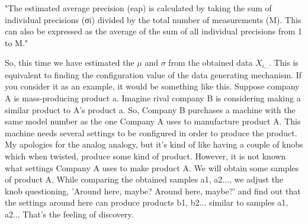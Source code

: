 \documentclass{ltjsbook}
\begin{document}
"The estimated average precision (eap) is calculated by taking the sum of individual precisions (σi) divided by the total number of measurements (M). This can also be expressed as the average of the sum of all individual precisions from 1 to M."

So, this time we have estimated the $\mu$ and $\sigma$ from the obtained data $X_{i,.}$. This is equivalent to finding the configuration value of the data generating mechanism.
If you consider it as an example, it would be something like this.
Suppose company A is mass-producing product a. Imagine rival company B is considering making a similar product to A's product a.
So, Company B purchases a machine with the same model number as the one Company A uses to manufacture product A. This machine needs several settings to be configured in order to produce the product. My apologies for the analog analogy, but it's kind of like having a couple of knobs which when twisted, produce some kind of product. However, it is not known what settings Company A uses to make product A.
We will obtain some samples of product A. While comparing the obtained samples a1, a2..., we adjust the knob questioning, 'Around here, maybe? Around here, maybe?' and find out that the settings around here can produce products b1, b2... similar to samples a1, a2... That's the feeling of discovery.
\end{document}
